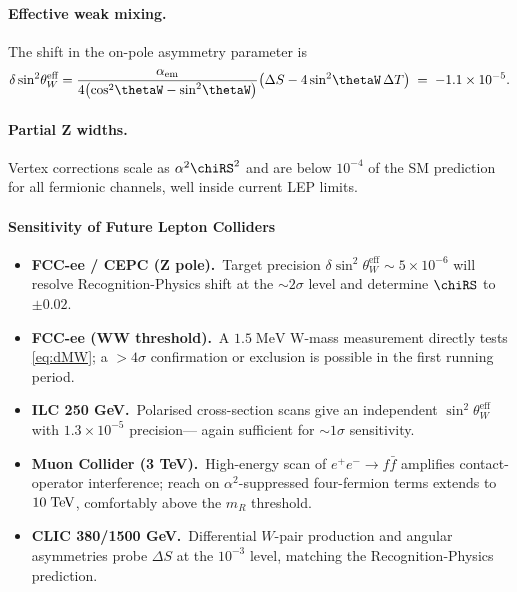 \documentclass[11pt,oneside]{book}
\begin{document}
{\paragraph{Effective weak mixing.}
The shift in the on-pole asymmetry parameter is
\[
   \delta\sin^{2}\!\theta_{W}^{\text{eff}}
   =
   \frac{\alpha_{\text{em}}}{4\bigl(\cos^{2}\!\thetaW
                                     -\sin^{2}\!\thetaW\bigr)}
   \bigl(\Delta S-4\sin^{2}\!\thetaW\,\Delta T\bigr)
   \;=\;
   -1.1\times10^{-5}.
\]

\paragraph{Partial Z widths.}
Vertex corrections scale as \(\alpha^{2}\chiRS^{2}\)
and are below \(10^{-4}\) of the SM prediction for all fermionic
channels, well inside current LEP limits.

\paragraph{Sensitivity of Future Lepton Colliders}

\begin{itemize}\setlength\itemsep{3pt}
\item \textbf{FCC-ee / CEPC (Z pole).}\
  Target precision
  \(\delta\sin^{2}\!\theta_{W}^{\text{eff}}\sim 5\times10^{-6}\)
  will resolve Recognition-Physics shift
  at the \(\sim2\sigma\) level and determine
  \(\chiRS\) to \(\pm0.02\).

\item \textbf{FCC-ee (WW threshold).}\
  A \(1.5\;\text{MeV}\) W-mass measurement directly
  tests \eqref{eq:dMW}; a \(>4\sigma\) confirmation
  or exclusion is possible in the first running period.

\item \textbf{ILC 250 GeV.}\
  Polarised cross-section scans give an independent
  \(\sin^{2}\!\theta_{W}^{\text{eff}}\) with
  \(1.3\times10^{-5}\) precision—
  again sufficient for \(\sim1\sigma\) sensitivity.

\item \textbf{Muon Collider (3 TeV).}\
  High-energy scan of \(e^{+}e^{-}\to f\bar f\)
  amplifies contact-operator interference; reach on
  \(\alpha^{2}\)-suppressed four-fermion terms extends
  to \(10\;{\rm TeV}\), comfortably above the
  \(m_{R}\) threshold.

\item \textbf{CLIC 380/1500 GeV.}\
  Differential \(W\)-pair production and angular
  asymmetries probe \(\Delta S\) at the \(10^{-3}\) level,
  matching the Recognition-Physics prediction.
\end{itemize}

}
\end{document}
